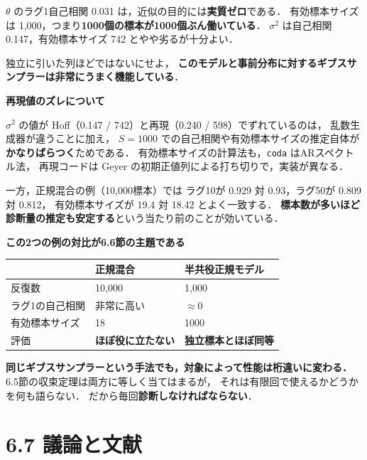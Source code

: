 \documentclass[lualatex,ja=standard,a4paper,12pt]{bxjsarticle}
\begin{document}
\medskip
\noindent $\theta$ のラグ1自己相関 0.031 は，近似の目的には\textbf{実質ゼロ}である．
有効標本サイズは 1,000，つまり\textbf{1000個の標本が1000個ぶん働いている}．
$\sigma^2$ は自己相関 0.147，有効標本サイズ 742 とやや劣るが十分よい．

\medskip
独立に引いた列ほどではないにせよ，
\textbf{このモデルと事前分布に対するギブスサンプラーは非常にうまく機能している}．

\begin{pointbox}
\textbf{再現値のズレについて}

$\sigma^2$ の値が Hoff（0.147 / 742）と再現（0.240 / 598）でずれているのは，
乱数生成器が違うことに加え，
$S = 1000$ での自己相関や有効標本サイズの推定自体が
\textbf{かなりばらつく}ためである．
有効標本サイズの計算法も，\texttt{coda} はARスペクトル法，
再現コードは Geyer の初期正値列による打ち切りで，実装が異なる．

\medskip
一方，正規混合の例（10,000標本）では
ラグ10が 0.929 対 0.93，ラグ50が 0.809 対 0.812，
有効標本サイズが 19.4 対 18.42 とよく一致する．
\textbf{標本数が多いほど診断量の推定も安定する}という当たり前のことが効いている．
\end{pointbox}

\begin{pointbox}
\textbf{この2つの例の対比が6.6節の主題である}

\begin{center}
\renewcommand{\arraystretch}{1.5}
\begin{tabular}{lll}
\toprule
 & 正規混合 & 半共役正規モデル \\
\midrule
反復数 & 10,000 & 1,000 \\
ラグ1の自己相関 & 非常に高い & $\approx 0$ \\
有効標本サイズ & 18 & 1000 \\
評価 & \textbf{ほぼ役に立たない} & \textbf{独立標本とほぼ同等} \\
\bottomrule
\end{tabular}
\end{center}

\medskip
\textbf{同じギブスサンプラーという手法でも，対象によって性能は桁違いに変わる．}
6.5節の収束定理は両方に等しく当てはまるが，
それは有限回で使えるかどうかを何も語らない．
だから毎回\textbf{診断しなければならない}．
\end{pointbox}

\section{6.7\; 議論と文献}
\end{document}
